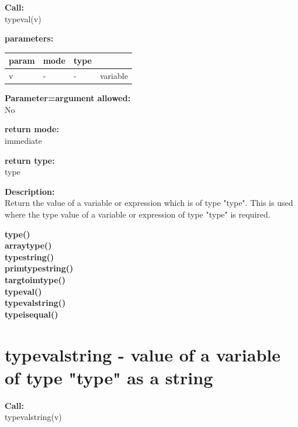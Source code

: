         {\bf Call:} \\
        typeval(v)
        
        {\bf parameters:} \\
        \begin{tabular}{| l | l | l | l |}
        \hline
        param  & mode & type & \\
        \hline \hline
        v & - &  -  & variable \\ \hline
        \end{tabular}
        
        {\bf Parameter=argument allowed:} \\
        No
        
        {\bf return mode:} \\
        immediate

        {\bf return type:} \\
        type
        
        {\bf Description:} \\
        Return the value of a variable or expression which is of type "type".
        This is used where the type value of a variable or expression of type
        "type" is required.
        
        
        {\bf type()}  \\
        {\bf arraytype()}  \\
        {\bf typestring()}  \\
        {\bf primtypestring()}  \\
        {\bf targtoimtype()}  \\
        {\bf typeval()}  \\
        {\bf typevalstring()}  \\
        {\bf typeisequal()}  \\


    \section{typevalstring - value of a variable of type "type" as a string}\label{sec:iftypevalstr}
        
        {\bf Call:} \\
        typevalstring(v)
        
